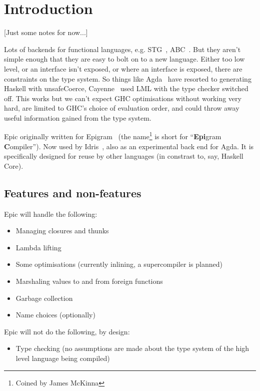 \section{Introduction}

[Just some notes for now...]

Lots of backends for functional languages,
e.g. STG~\cite{evalpush,stg,llvm-haskell}, ABC~\cite{abc-machine}.
But they aren't simple enough that they are easy to bolt on to a new
language. Either too low level, or an interface isn't exposed, or
where an interface is exposed, there are constraints on the type
system. So things like Agda~\cite{norell-thesis} have resorted to
generating Haskell with unsafeCoerce, Cayenne~\cite{cayenne-icfp} used LML
with the type checker switched off. This works but we can't expect
GHC optimisations without working very hard, are limited to GHC's
choice of evaluation order, and could throw away useful information
gained from the type system.

Epic originally written for Epigram~\cite{levitation} (the
name\footnote{Coined by James McKinna} is
short for ``\textbf{Epi}gram \textbf{C}ompiler''). Now used by
Idris~\cite{idris-plpv}, also as an experimental back end for Agda.
It is specifically designed for reuse by other languages (in constrast
to, say, Haskell Core).

\subsection{Features and non-features}

Epic will handle the following:

\begin{itemize}
\item Managing closures and thunks
\item Lambda lifting
\item Some optimisations (currently inlining, a supercompiler is planned)
\item Marshaling values to and from foreign functions
\item Garbage collection
\item Name choices (optionally)
\end{itemize}

\noindent
Epic will not do the following, by design:

\begin{itemize}
\item Type checking (no assumptions are made about the type system of
  the high level language being compiled)
\end{itemize}

